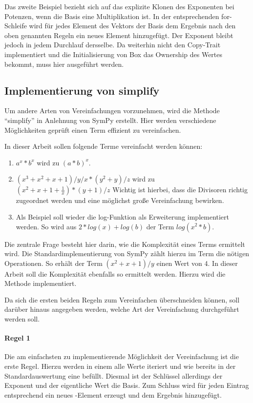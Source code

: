 \documentclass[11pt,a4paper, ngerman]{article}
\begin{document}
Das zweite Beispiel bezieht sich auf das explizite Klonen des Exponenten bei Potenzen, wenn die Basis eine Multiplikation ist. In der entsprechenden for-Schleife wird für jedes Element des Vektors der Basis dem Ergebnis nach den oben genannten Regeln ein neues Element hinzugefügt. Der Exponent bleibt jedoch in jedem Durchlauf dersselbe. Da  weiterhin nicht den Copy-Trait implementiert und die Initialisierung von Box das Ownership des Wertes bekommt, muss hier  ausgeführt werden.

\subsection{Implementierung von simplify}
Um andere Arten von Vereinfachungen vorzunehmen, wird die Methode ``simplify'' in Anlehnung von SymPy \cite[S. 7 ff.]{SympyPeerJ} erstellt. Hier werden verschiedene Möglichkeiten geprüft einen Term effizient zu vereinfachen.

In dieser Arbeit sollen folgende Terme vereinfacht werden können:

\begin{enumerate}
    \item $a^x * b^x$ wird zu $(a*b)^x$.
    \item $(x^3+x^2+x+1)/y/x*(y^2+y)/z$ wird zu $(x^2+x+1+\frac{1}{x})*(y+1)/z$ Wichtig ist hierbei, dass die Divisoren richtig zugeordnet werden und eine möglichst große Vereinfachung bewirken.
    \item Als Beispiel soll wieder die log-Funktion als Erweiterung implementiert werden. So wird aus $2*log(x)+log(b)$ der Term $log(x^2*b)$.
\end{enumerate}

Die zentrale Frage besteht hier darin, wie die Komplexität eines Terms ermittelt wird. Die Standardimplementierung von SymPy zählt hierzu im Term die nötigen Operationen. So erhält der Term $(x^2+x+1)/y$ einen Wert von 4. In dieser Arbeit soll die Komplexität ebenfalls so ermittelt werden. Hierzu wird die Methode  implementiert.

Da sich die ersten beiden Regeln zum Vereinfachen überschneiden können, soll darüber hinaus angegeben werden, welche Art der Vereinfachung durchgeführt werden soll.

\paragraph{Regel 1} Die am einfachsten zu implementierende Möglichkeit der Vereinfachung ist die erste Regel. Hierzu werden in einem  alle Werte iteriert und wie bereits in der Standardauswertung eine  befüllt. Diesmal ist der Schlüssel allerdings der Exponent und der eigentliche Wert die Basis. Zum Schluss wird für jeden Eintrag entsprechend ein neues -Element erzeugt und dem Ergebnis hinzugefügt.
\end{document}
